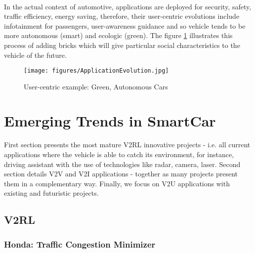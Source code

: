 \documentclass[a4paper]{article}
\begin{document}
\paragraph{}In the actual context of automotive, applications are deployed for security, safety, traffic efficiency, energy saving, therefore, their user-centric evolutions include infotainment for passengers, user-awareness guidance and so vehicle tends to be more autonomous (smart) and ecologic (green). The figure \ref{ApplicationEvolution} illustrates this process of adding bricks which will give particular social characteristics to the vehicle of the future.
\begin{figure}[!htb]
\begin{center}
\texttt{[image: figures/ApplicationEvolution.jpg]}
\caption{User-centric example: Green, Autonomous Cars}
\label{ApplicationEvolution}
\end{center}
\end{figure}
 \section{Emerging Trends in SmartCar}

\paragraph{}First section presents the most mature V2RL innovative projects - i.e. all current applications where the vehicle is able to catch its environment, for instance, driving assistant with the use of technologies like radar, camera, laser. Second section details V2V and V2I applications - together as many projects present them in a complementary way. Finally, we focus on V2U applications with existing and futuristic projects.

\subsection{V2RL}

\subsubsection{Honda: Traffic Congestion Minimizer}
\end{document}
